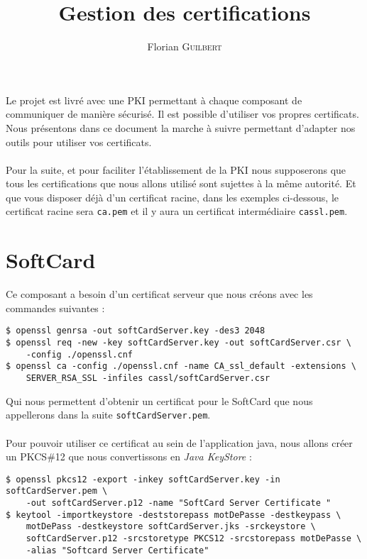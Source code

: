 \documentclass[a4paper,10pt]{article}
\title{Gestion des certifications}
\author{Florian \textsc{Guilbert}}
\begin{document}
\maketitle
\tableofcontents

Le projet est livré avec une PKI permettant à chaque composant de communiquer
de manière sécurisé. Il est possible d'utiliser vos propres certificats. 
Nous présentons dans ce document la marche à suivre permettant d'adapter 
nos outils pour utiliser vos certificats.

\paragraph{}
Pour la suite, et pour faciliter l'établissement de la PKI nous supposerons
que tous les certifications que nous allons utilisé sont sujettes à la 
même autorité. Et que vous disposer déjà d'un certificat racine, dans 
les exemples ci-dessous, le certificat racine sera \texttt{ca.pem} et 
il y aura un certificat intermédiaire \texttt{cassl.pem}.

\section{SoftCard}
Ce composant a besoin d'un certificat serveur que nous créons avec les 
commandes suivantes : 
\begin{verbatim}
$ openssl genrsa -out softCardServer.key -des3 2048
$ openssl req -new -key softCardServer.key -out softCardServer.csr \
    -config ./openssl.cnf
$ openssl ca -config ./openssl.cnf -name CA_ssl_default -extensions \
    SERVER_RSA_SSL -infiles cassl/softCardServer.csr
\end{verbatim}
Qui nous permettent d'obtenir un certificat pour le SoftCard que nous 
appellerons dans la suite \texttt{softCardServer.pem}.

\paragraph{}
Pour pouvoir utiliser ce certificat au sein de l'application java, nous allons
créer un PKCS\#12 que nous convertissons en \emph{Java KeyStore} : 
\begin{verbatim}
$ openssl pkcs12 -export -inkey softCardServer.key -in softCardServer.pem \ 
    -out softCardServer.p12 -name "SoftCard Server Certificate "
$ keytool -importkeystore -deststorepass motDePasse -destkeypass \ 
    motDePass -destkeystore softCardServer.jks -srckeystore \ 
    softCardServer.p12 -srcstoretype PKCS12 -srcstorepass motDePasse \ 
    -alias "Softcard Server Certificate"
\end{verbatim}
\end{document}
